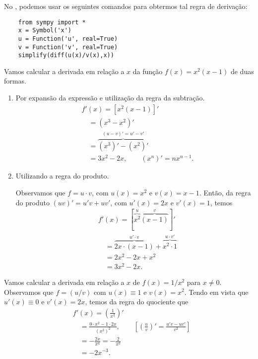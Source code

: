 \begin{itemize}
  \ifispython
  No \sympy, podemos usar os seguintes comandos para obtermos tal regra de derivação:
  \begin{lstlisting}
    from sympy import *
    x = Symbol('x')
    u = Function('u', real=True)
    v = Function('v', real=True)
    simplify(diff(u(x)/v(x),x))
\end{lstlisting}
  \fi
\end{itemize}

\begin{ex}
  Vamos calcular a derivada em relação a $x$ da função $f(x) = x^2(x-1)$ de duas formas.
  \begin{enumerate}[1.]
  \item Por expansão da expressão e utilização da regra da subtração.
    \begin{align}
      & f'(x) = [x^2(x-1)]'\\
      & \text{}\quad = (x^3-x^2)' \\
      & \text{}\quad = \overbrace{(x^3)'-(x^2)'}^{(u-v)'=u'-v'}\\
      & \text{}\quad = 3x^2-2x,\quad\quad(x^n)' = nx^{n-1}.
    \end{align}
  \item Utilizando a regra do produto.

    Observamos que $f = u\cdot v$, com $u(x) = x^2$ e $v(x) = x-1$. Então, da regra do produto $(uv)' = u'v + uv'$, com $u'(x) = 2x$ e $v'(x) = 1$, temos
    \begin{align}
      & f'(x) = [\overbrace{x^2}^{u}\overbrace{(x-1)}^{v}]'\\
      & \text{}\quad = \overbrace{2x\cdot (x-1)}^{u'\cdot v} + \overbrace{x^2\cdot 1}^{u\cdot v'}\\
      & \text{}\quad = 2x^2 - 2x + x^2\\
      & \text{}\quad = 3x^2 - 2x.
    \end{align}
  \end{enumerate}
\end{ex}

\begin{ex}\label{ex:deriv_x-2}
  Vamos calcular a derivada em relação a $x$ de $f(x) = 1/x^2$ para $x\neq 0$. Observamos que $f = (u/v)$ com $u(x) \equiv 1$ e $v(x) = x^2$. Tendo em vista que $u'(x) \equiv 0$ e $v'(x) = 2x$, temos da regra do quociente que
  \begin{align}
    & f'(x) = \left(\frac{1}{x^2}\right)' \\
    & \text{}\quad = \frac{0\cdot x^2 - 1\cdot 2x}{(x^2)^2},\quad\quad\left[\left(\frac{u}{v}\right)' = \frac{u'v-uv'}{v^2}\right] \\
    & \text{}\quad = -\frac{2x}{x^4} = -\frac{2}{x^3}\\
    & \text{}\quad = -2x^{-3}.
  \end{align}
\end{ex}

